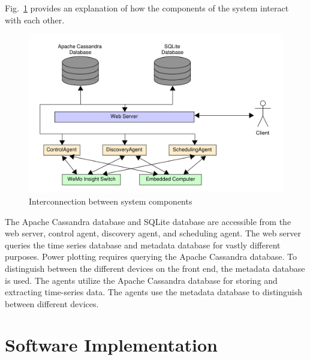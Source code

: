 \documentclass[conference]{IEEEtran}
\begin{document}
Fig.~\ref{fig:systemComponentInterconnection} provides an explanation of how
the components of the system interact with each other. %
%
\begin{figure}
  \centering
  \includegraphics[scale=0.3]{figs/overallDiagram.pdf}
  \caption{Interconnection between system components}
  \label{fig:systemComponentInterconnection}
\end{figure}
%
The Apache Cassandra database and SQLite database are accessible from the web server, control agent, discovery agent, and scheduling agent. The web server queries the time series database and metadata database for vastly different purposes. Power plotting requires querying the Apache Cassandra database. To distinguish between the different devices on the front end, the metadata database is used. The agents utilize the Apache Cassandra database for storing and extracting time-series data. The agents use the metadata database to distinguish between different devices. 

\section{Software Implementation}
\label{sec:SoftwareImplementation}
\end{document}
